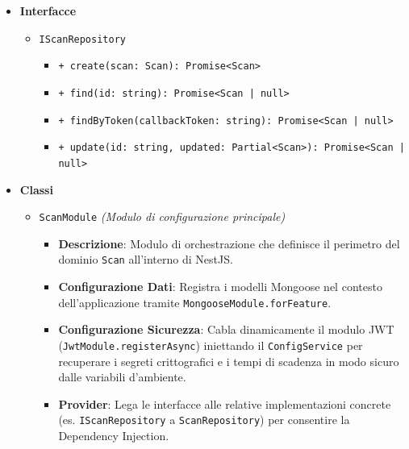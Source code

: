 \documentclass[a4paper, 11pt]{article}
\begin{document}
\begin{itemize}
  \item \textbf{Interfacce}
    \begin{itemize}
      \item \texttt{IScanRepository}
        \begin{itemize}
          \item \texttt{+ create(scan: Scan): Promise<Scan>}
          \item \texttt{+ find(id: string): Promise<Scan | null>}
          \item \texttt{+ findByToken(callbackToken: string): Promise<Scan | null>}
          \item \texttt{+ update(id: string, updated: Partial<Scan>): Promise<Scan | null>}
        \end{itemize}
    \end{itemize}
  \item \textbf{Classi}
    \begin{itemize}
      \item \texttt{ScanModule} \textit{(Modulo di configurazione principale)}
        \begin{itemize}
          \item \textbf{Descrizione}: Modulo di orchestrazione che definisce il perimetro del dominio \texttt{Scan} all'interno di NestJS.
          \item \textbf{Configurazione Dati}: Registra i modelli Mongoose nel contesto dell'applicazione tramite \texttt{MongooseModule.forFeature}.
          \item \textbf{Configurazione Sicurezza}: Cabla dinamicamente il modulo JWT (\texttt{JwtModule.registerAsync}) iniettando il \texttt{ConfigService} per recuperare i segreti crittografici e i tempi di scadenza in modo sicuro dalle variabili d'ambiente.
          \item \textbf{Provider}: Lega le interfacce alle relative implementazioni concrete (es. \texttt{IScanRepository} a \texttt{ScanRepository}) per consentire la Dependency Injection.
        \end{itemize}
        

\end{itemize}
\end{itemize}
\end{document}
